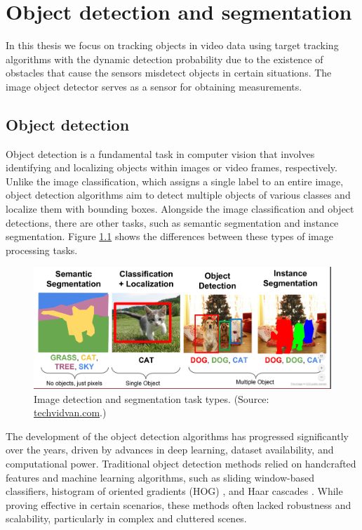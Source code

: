 \chapter{Object detection and segmentation}
In this thesis we focus on tracking objects in video data using target tracking algorithms with the dynamic detection probability due to the existence of obstacles that cause the sensors misdetect objects in certain situations. The image object detector serves as \linebreak a sensor for obtaining measurements.


\section{Object detection}
Object detection is a fundamental task in computer vision that involves identifying and localizing objects
within images or video frames, respectively. Unlike the image classification, which assigns a single label to an entire
image, object
detection algorithms aim to detect multiple objects of various classes and localize them with bounding boxes.
Alongside the image classification and object detections, there are other tasks, such as semantic segmentation and
instance segmentation. Figure \ref{fig:seg_type} shows the differences between these types of image processing tasks.

\begin{figure}
  \centering
  \includegraphics[width=\linewidth]{text/chapter_03/imgs/segmentation-types}
  \caption{Image detection and segmentation task types. (Source: \href{https://techvidvan.com/tutorials/image-segmentation-machine-learning/}{techvidvan.com}.)}
  \label{fig:seg_type}
\end{figure}

The development of the object detection algorithms has progressed significantly over the years, driven by advances in deep
learning, dataset availability, and computational power. Traditional object detection methods relied on handcrafted
features and machine learning algorithms, such as sliding window-based classifiers, histogram of oriented gradients (HOG) \cite{HoOGDalal2005}, and Haar cascades \cite{HaarCascadesLi2016}. While proving effective in certain scenarios, these methods often lacked robustness and scalability, particularly in complex and cluttered scenes.

